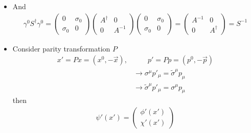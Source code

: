 \documentclass[10pt,a4paper]{report}
\theoremstyle{definition}
\begin{document}
\begin{itemize}
\begin{align}
\begin{matrix}
0 & \sigma_k\\-\sigma_k&0
\end{matrix}\right)+\right]
\left(\begin{matrix}
A^{-1} & 0\\0&A^\dagger
\end{matrix}
\right)\\
&=\left(\begin{matrix}
0 & A(\sigma^\mu p_\mu)A^\dagger\\
{A^\dagger}^{-1}(\tilde{\sigma}^\mu p_\mu)A^{-1} &0
\end{matrix}
\right)\\
&=...\\
&=\Lambda^{-1}(A)^\mu_{\,\nu}\gamma^\nu\, p_\mu
\end{align}
or equivalently:
\begin{align}
S(A)^{-1}\gamma^\mu S(A)
&=\Lambda^\mu_{\,\nu}\gamma^\nu
\end{align}
\item And
\begin{align}
\gamma^0S^\dagger\gamma^0
=\left(
\begin{matrix}
0&\sigma_0\\ \sigma_0&0
\end{matrix}
\right)
\left(
\begin{matrix}
A^\dagger&0\\ 0&A^{-1}
\end{matrix}
\right)
\left(
\begin{matrix}
0&\sigma_0\\ \sigma_0&0
\end{matrix}
\right)
=\left(
\begin{matrix}
A^{-1}&0\\ 0&A^\dagger
\end{matrix}
\right)
=S^{-1}
\end{align}
\item Consider parity transformation $P$
\begin{align}
x'=Px=(x^0,-\vec{x}),&\qquad p'=Pp=(p^0,-\vec{p})\\
&\rightarrow\sigma^\mu p'_\mu=\tilde{\sigma}^\mu p_\mu\\
&\rightarrow\tilde{\sigma}^\mu p'_\mu=\sigma^\mu p_\mu
\end{align}
then
\begin{align}
\psi'(x')
=\left(\begin{matrix}
\phi'(x')\\ \chi'(x')
\end{matrix}\right)

\end{align}
\end{itemize}
\end{document}
